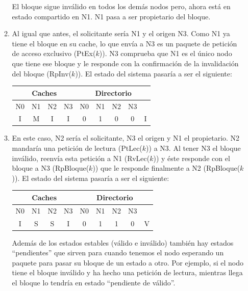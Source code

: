 \documentclass[10pt,a4paper,spanish]{report}
\begin{document}
\begin{enumerate}[a)]
\begin{enumerate}[1.]
    El bloque sigue inválido en todos los demás nodos pero, ahora está en estado compartido en N1. N1 pasa a ser propietario del bloque.

    \item Al igual que antes, el solicitante sería N1 y el origen N3. Como N1 ya tiene el bloque en su cache, lo que envía a N3 es un paquete de petición de acceso exclusivo (PtEx($k$)). N3 comprueba que N1 es el único nodo que tiene ese bloque y le responde con la confirmación de la invalidación del bloque (RpInv($k$)). El estado del sistema pasaría a ser el siguiente:

    \begin{center}
    \begin{tabular}{|c|c|c|c|c|c|c|c|c|}
    \hline
    \multicolumn{4}{|c|}{Caches} & \multicolumn{5}{|c|}{Directorio} \\
    \hline
    N0 & N1 & N2 & N3 & N0 & N1 & N2 & N3 & \\
    \hline
    I & M & I & I & 0 & 1 & 0 & 0 & I \\
    \hline
    \end{tabular}
    \end{center}

    \item En este caso, N2 sería el solicitante, N3 el origen y N1 el propietario. N2 mandaría una petición de lectura (PtLec($k$)) a N3. Al tener N3 el bloque inválido, reenvía esta petición a N1 (RvLec($k$)) y éste responde con el bloque a N3 (RpBloque($k$)) que le responde finalmente a N2 (RpBloque($k$)). El estado del sistema pasaría a ser el siguiente:

    \begin{center}
    \begin{tabular}{|c|c|c|c|c|c|c|c|c|}
    \hline
    \multicolumn{4}{|c|}{Caches} & \multicolumn{5}{|c|}{Directorio} \\
    \hline
    N0 & N1 & N2 & N3 & N0 & N1 & N2 & N3 & \\
    \hline
    I & S & S & I & 0 & 1 & 1 & 0 & V \\
    \hline
    \end{tabular}
    \end{center}    

    Además de los estados estables (válido e inválido) también hay estados ``pendientes'' que sirven para cuando tenemos el nodo esperando un paquete para pasar su bloque de un estado a otro. Por ejemplo, si el nodo tiene el bloque inválido y ha hecho una petición de lectura, mientras llega el bloque lo tendría en estado ``pendiente de válido''.


\end{enumerate}
\end{enumerate}
\end{document}
